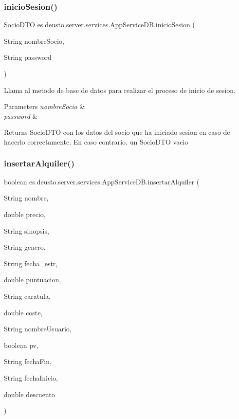 \subsubsection{\texorpdfstring{inicioSesion()}{inicioSesion()}}
{\footnotesize\ttfamily \mbox{\hyperlink{classes_1_1deusto_1_1server_1_1dto_1_1_socio_d_t_o}{Socio\+D\+TO}} es.\+deusto.\+server.\+services.\+App\+Service\+D\+B.\+inicio\+Sesion (\begin{DoxyParamCaption}\item[{String}]{nombre\+Socio,  }\item[{String}]{password }\end{DoxyParamCaption})}

Llama al metodo de base de datos para realizar el proceso de inicio de sesion. 
\begin{DoxyParams}{Parameters}
{\em nombre\+Socio} & \\
\hline
{\em password} & \\
\hline
\end{DoxyParams}
\begin{DoxyReturn}{Returns}
Socio\+D\+TO con los datos del socio que ha iniciado sesion en caso de hacerlo correctamente. En caso contrario, un Socio\+D\+TO vacio 
\end{DoxyReturn}
\mbox{\label{classes_1_1deusto_1_1server_1_1services_1_1_app_service_d_b_a1d8255fd9345da3dac1396df7ce42468}} 
\subsubsection{\texorpdfstring{insertarAlquiler()}{insertarAlquiler()}}
{\footnotesize\ttfamily boolean es.\+deusto.\+server.\+services.\+App\+Service\+D\+B.\+insertar\+Alquiler (\begin{DoxyParamCaption}\item[{String}]{nombre,  }\item[{double}]{precio,  }\item[{String}]{sinopsis,  }\item[{String}]{genero,  }\item[{String}]{fecha\+\_\+estr,  }\item[{double}]{puntuacion,  }\item[{String}]{caratula,  }\item[{double}]{coste,  }\item[{String}]{nombre\+Usuario,  }\item[{boolean}]{pv,  }\item[{String}]{fecha\+Fin,  }\item[{String}]{fecha\+Inicio,  }\item[{double}]{descuento }\end{DoxyParamCaption})}

